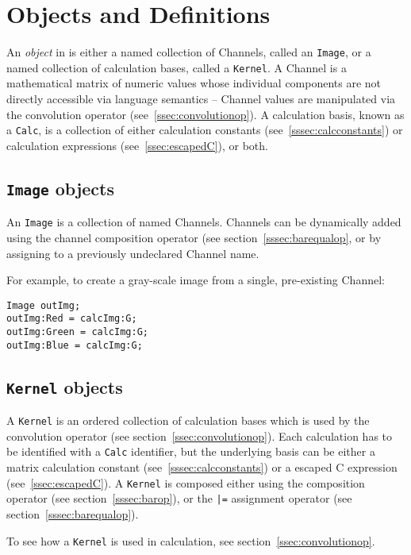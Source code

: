 \section{Objects and Definitions}
\label{sec:objdef}
An \emph{object} in \sys{} is either a named collection of Channels, called an
\texttt{Image}, or a named collection of calculation bases, called a
\texttt{Kernel}. A Channel is a mathematical matrix of numeric values
whose individual components are not directly accessible via \sys{} language
semantics -- Channel values are manipulated via the convolution
operator (see~\ref{ssec:convolutionop}). A calculation basis, known as a
\texttt{Calc}, is a collection of either calculation constants
(see~\ref{sssec:calcconstants}) or calculation expressions (see~\ref{ssec:escapedC}),
or both.

\subsection{\texttt{Image} objects}
\label{ssec:images}
An \texttt{Image} is a collection of named Channels. Channels can
be dynamically added  using the channel composition
operator (see section~\ref{sssec:barequalop}, or by assigning to a previously
undeclared Channel name. 

For example, to create a gray-scale image from a single, pre-existing
Channel:
\begin{lstlisting}[language=CLAM,escapechar=\%]
Image outImg;
outImg:Red = calcImg:G;
outImg:Green = calcImg:G;
outImg:Blue = calcImg:G;
\end{lstlisting}

\subsection{\texttt{Kernel} objects}
\label{ssec:kernels}
A \texttt{Kernel} is an ordered collection of calculation bases which is used by the convolution
operator (see section~\ref{ssec:convolutionop}). Each calculation has to be identified with a \texttt{Calc}
identifier, but the underlying basis can be either
a matrix calculation constant (see~\ref{sssec:calcconstants}) or a escaped C expression
(see~\ref{ssec:escapedC}). A \texttt{Kernel} is composed either using the composition
operator (see section~\ref{sssec:barop}), or the \texttt{|=} assignment operator (see section~\ref{sssec:barequalop}).

To see how a \texttt{Kernel} is used in calculation, see section~\ref{ssec:convolutionop}.
